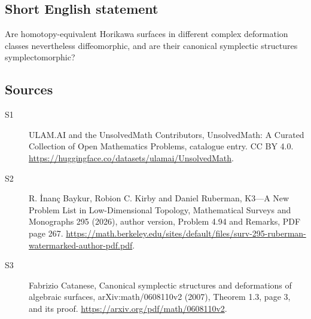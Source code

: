 \documentclass[11pt]{article}
\begin{document}
\subsection{Short English statement}
Are homotopy-equivalent Horikawa surfaces in different complex deformation classes nevertheless diffeomorphic, and are their canonical symplectic structures symplectomorphic?
\subsection{Sources}
\begin{description}
\item[\hypertarget{source:statement:1}{S1}] ULAM.AI and the UnsolvedMath Contributors, UnsolvedMath: A Curated Collection of Open Mathematics Problems, catalogue entry. CC BY 4.0. \url{https://huggingface.co/datasets/ulamai/UnsolvedMath}.
\item[\hypertarget{source:statement:2}{S2}] R. İnanç Baykur, Robion C. Kirby and Daniel Ruberman, K3—A New Problem List in Low-Dimensional Topology, Mathematical Surveys and Monographs 295 (2026), author version, Problem 4.94 and Remarks, PDF page 267. \url{https://math.berkeley.edu/sites/default/files/surv-295-ruberman-watermarked-author-pdf.pdf}.
\item[\hypertarget{source:statement:3}{S3}] Fabrizio Catanese, Canonical symplectic structures and deformations of algebraic surfaces, arXiv:math/0608110v2 (2007), Theorem 1.3, page 3, and its proof. \url{https://arxiv.org/pdf/math/0608110v2}.
\end{description}
\label{end:statement}
\end{document}
